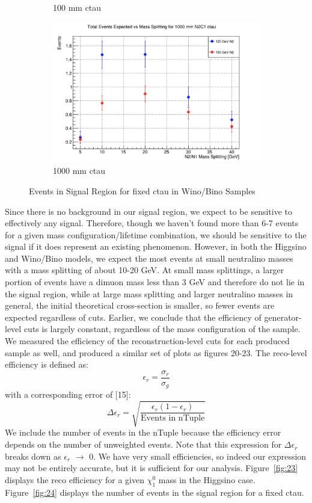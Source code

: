 \documentclass{article}
\begin{document}
\begin{figure} [H]
\begin{subfigure}{.5\textwidth}
  \caption{100 mm ctau}
  \label{fig:sub-third18}
\end{subfigure}
\begin{subfigure}{.5\textwidth}
  \centering
  \includegraphics[width=.8\linewidth]{1000mmWino.png}  
  \caption{1000 mm ctau}
  \label{fig:sub-fourth18}
\end{subfigure}
\caption{Events in Signal Region for fixed ctau in Wino/Bino Samples}
\label{fig:22}
\end{figure}
\par
Since there is no background in our signal region, we expect to be sensitive to effectively any signal. Therefore, though we haven't found more than 6-7 events for a given mass configuration/lifetime combination, we should be sensitive to the signal if it does represent an existing phenomenon. However, in both the Higgsino and Wino/Bino models, we expect the most events at small neutralino masses with a mass splitting of about 10-20 GeV. At small mass splittings, a larger portion of events have a dimuon mass less than 3 GeV and therefore do not lie in the signal region, while at large mass splitting and larger neutralino masses in general, the initial theoretical cross-section is smaller, so fewer events are expected regardless of cuts. Earlier, we conclude that the efficiency of generator-level cuts is largely constant, regardless of the mass configuration of the sample. We measured the efficiency of the reconstruction-level cuts for each produced sample as well, and produced a similar set of plots as figures 20-23. The reco-level efficiency is defined as:
\[\epsilon_{r} = \frac{\sigma_{r}}{\sigma_{g}}\]
with a corresponding error of [15]:
\[\Delta\epsilon_{r} = \sqrt{\frac{\epsilon_{r}(1-\epsilon_{r})}{\text{Events in nTuple}}}\]
We include the number of events in the nTuple because the efficiency error depends on the number of unweighted events. Note that this expression for $\Delta\epsilon_{r}$ breaks down as $\epsilon_{r}$ $\rightarrow$ 0. We have very small efficiencies, so indeed our expression may not be entirely accurate, but it is sufficient for our analysis. Figure~\ref{fig:23} displays the reco efficiency for a given $\chi_{1}^{0}$ mass in the Higgsino case. Figure~\ref{fig:24} displays the number of events in the signal region for a fixed ctau.
\end{document}
